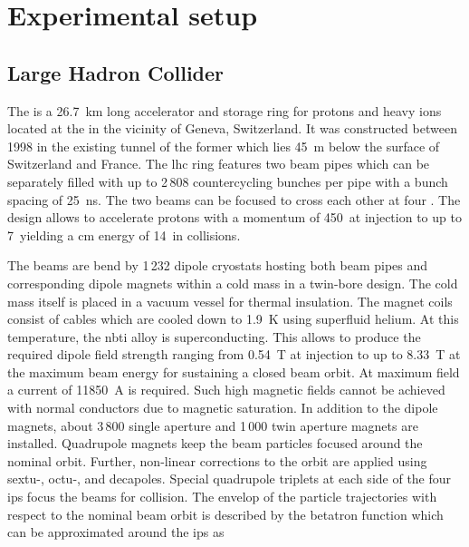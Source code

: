 \chapter{Experimental setup}


\section{Large Hadron Collider}

The  is a 26.7~km long accelerator and storage ring for protons and heavy ions located at the  in the vicinity of Geneva, Switzerland. It was constructed between 1998 in the existing tunnel of the former  which lies 45~m below the surface of Switzerland and France. The \gls{lhc} ring features two beam pipes which can be separately filled with up to 2\,808 countercycling bunches per pipe with a bunch spacing of 25~ns. The two beams can be focused to cross each other at four . The design allows to accelerate protons with a momentum of 450~\GeV at injection to up to 7~\TeV yielding a \acrlong{cm} energy of 14~\TeV in collisions.

The beams are bend by 1\,232 dipole cryostats hosting both beam pipes and corresponding dipole magnets within a cold mass in a twin-bore design. The cold mass itself is placed in a vacuum vessel for thermal insulation. The magnet coils consist of   cables which are cooled down to 1.9~K using superfluid helium. At this temperature, the \gls{nbti} alloy is superconducting. This allows to produce the required dipole field strength ranging from 0.54~T at injection to up to 8.33~T at the maximum beam energy for sustaining a closed beam orbit. At maximum field a current of 11850~A is required. Such high magnetic fields cannot be achieved with normal conductors due to magnetic saturation. In addition to the dipole magnets, about 3\,800 single aperture and 1\,000 twin aperture magnets are installed. Quadrupole magnets keep the beam particles focused around the nominal orbit. Further, non-linear corrections to the orbit are applied using sextu-, octu-, and decapoles. Special quadrupole triplets at each side of the four \glspl{ip} focus the beams for collision. The envelop of the particle trajectories with respect to the nominal beam orbit is described by the betatron function which can be approximated around the \glspl{ip} as 

